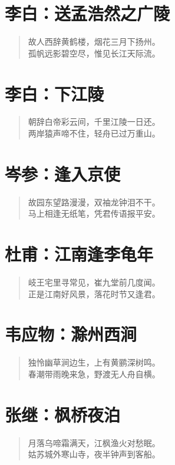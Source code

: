 \documentclass[12pt,oneside]{book}
\newenvironment{shici}{%
\begin{verse}\centering\yanti\large\hspace{12pt}}{\end{verse}}
\begin{document}
\begin{common-format}
\chapter{李白：送孟浩然之广陵}
\begin{shici}
故人西辞黄鹤楼，烟花三月下扬州。\\
孤帆远影碧空尽，惟见长江天际流。
\end{shici}

\chapter{李白：下江陵}
\begin{shici}
朝辞白帝彩云间，千里江陵一日还。\\
两岸猿声啼不住，轻舟已过万重山。
\end{shici}

\chapter{岑参：逢入京使}
\begin{shici}
故园东望路漫漫，双袖龙钟泪不干。\\
马上相逢无纸笔，凭君传语报平安。
\end{shici}

\chapter{杜甫：江南逢李龟年}
\begin{shici}
岐王宅里寻常见，崔九堂前几度闻。\\
正是江南好风景，落花时节又逢君。
\end{shici}

\chapter{韦应物：滁州西涧}
\begin{shici}
独怜幽草涧边生，上有黄鹂深树鸣。\\
春潮带雨晚来急，野渡无人舟自横。
\end{shici}

\chapter{张继：枫桥夜泊}
\begin{shici}
月落乌啼霜满天，江枫渔火对愁眠。\\
姑苏城外寒山寺，夜半钟声到客船。
\end{shici}


\end{common-format}
\end{document}

